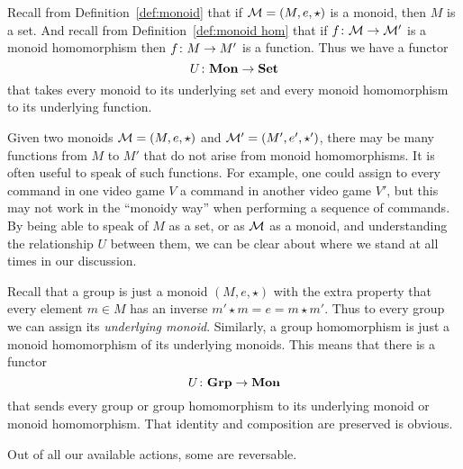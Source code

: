 \documentclass[CT4S-EN-RU]{subfiles}
\begin{document}
\begin{definitionRUS}\label{def:functor}
\end{definitionRUS}

\begin{exampleENG}
Recall from Definition~\ref{def:monoid} that if $\mathcal{M}=(M,e,\star)$ is a monoid, then $M$ is a set. And recall from Definition~\ref{def:monoid hom} that if $f\colon\mathcal{M}\rightarrow\mathcal{M}'$ is a monoid homomorphism then $f\colon M\rightarrow M'$ is a function. Thus we have a functor $$U\colon{\mathbf{Mon}}\rightarrow{\mathbf{Set}}$$ that takes every monoid to its underlying set and every monoid homomorphism to its underlying function. 

Given two monoids $\mathcal{M}=(M,e,\star)$ and $\mathcal{M}'=(M',e',\star')$, there may be many functions from $M$ to $M'$ that do not arise from monoid homomorphisms. It is often useful to speak of such functions. For example, one could assign to every command in one video game $V$ a command in another video game $V'$, but this may not work in the “monoidy way” when performing a sequence of commands. By being able to speak of $M$ as a set, or as $\mathcal{M}$ as a monoid, and understanding the relationship $U$ between them, we can be clear about where we stand at all times in our discussion.
\end{exampleENG}

\begin{exampleRUS}
\end{exampleRUS}

\begin{exampleENG}\label{ex:grp to monoid}
Recall that a group is just a monoid $(M,e,\star)$ with the extra property that every element $m\in M$ has an inverse $m'\star m=e=m\star m'$. Thus to every group we can assign its {\em underlying monoid}. Similarly, a group homomorphism is just a monoid homomorphism of its underlying monoids. This means that there is a functor $$U\colon{\mathbf{Grp}}\rightarrow{\mathbf{Mon}}$$ that sends every group or group homomorphism to its underlying monoid or monoid homomorphism. That identity and composition are preserved is obvious.
\end{exampleENG}

\begin{exampleRUS}\label{ex:grp to monoid}
\end{exampleRUS}

\begin{sloganENG}
Out of all our available actions, some are reversable. 
\end{sloganENG}
\end{document}
